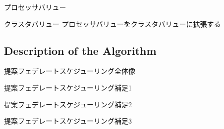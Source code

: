 \begin{frame}{プロセッサバリュー}
    \begin{definition}
        \begin{figure}[tb]
            \centering
        \end{figure}
    \end{definition}
\end{frame}

\begin{frame}{クラスタバリュー}
    プロセッサバリューをクラスタバリューに拡張する
    \begin{definition}
        \begin{figure}[tb]
            \centering
        \end{figure}
    \end{definition}
\end{frame}


\subsection{Description of the Algorithm}
\label{ssec: Description of the Algorithm}

\begin{frame}{提案フェデレートスケジューリング全体像}
\end{frame}

\begin{frame}{提案フェデレートスケジューリング補足1}
\end{frame}

\begin{frame}{提案フェデレートスケジューリング補足2}
\end{frame}

\begin{frame}{提案フェデレートスケジューリング補足3}
\end{frame}
